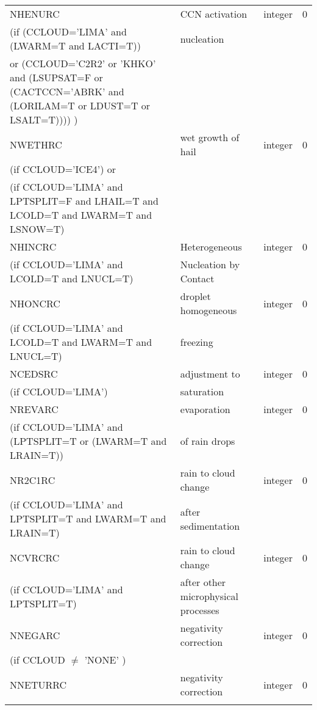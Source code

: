 \begin{longtable} {|p{}|p{}|>{\centering}p{}|p{}<{\centering}|}
NHENURC  & CCN activation  & integer  &  0 \index{NHENURC!\innam{NAM\_BU\_RRC}}\\ \nopagebreak
(if (CCLOUD='LIMA' and (LWARM=T and LACTI=T)) & nucleation & & \\ \nopagebreak
 or (CCLOUD='C2R2' or 'KHKO' and (LSUPSAT=F or (CACTCCN='ABRK' and (LORILAM=T or LDUST=T or LSALT=T)))) ) & & & \\ \hline
NWETHRC  & wet growth of hail & integer  &  0 \index{NWETHRC!\innam{NAM\_BU\_RRC}}\\ \nopagebreak
(if CCLOUD='ICE4') or & &   &  \\ \nopagebreak
(if CCLOUD='LIMA' and LPTSPLIT=F and LHAIL=T and LCOLD=T and LWARM=T and LSNOW=T) & &   &  \\\hline
NHINCRC  & Heterogeneous  & integer  &  0 \index{NHINCRC!\innam{NAM\_BU\_RRC}}\\ \nopagebreak
(if CCLOUD='LIMA' and LCOLD=T and LNUCL=T)   & Nucleation by Contact  &       &   \\\hline
NHONCRC  & droplet homogeneous   & integer  &  0 \index{NHONCRC!\innam{NAM\_BU\_RRC}}\\ \nopagebreak
(if CCLOUD='LIMA' and LCOLD=T and LWARM=T and LNUCL=T)   &freezing   &       &   \\\hline
NCEDSRC  & adjustment to & integer  &  0 \index{NCEDSRC!\innam{NAM\_BU\_RRC}}\\ \nopagebreak
(if CCLOUD='LIMA') &saturation &   &  \\\hline
NREVARC  & evaporation   & integer  &  0 \index{NREVARC!\innam{NAM\_BU\_RRC}}\\ \nopagebreak
(if CCLOUD='LIMA' and (LPTSPLIT=T or (LWARM=T and LRAIN=T)) & of rain drops &   &  \\\hline
NR2C1RC  & rain to cloud change & integer  &  0 \index{NR2C1RC!\innam{NAM\_BU\_RRC}}\\ \nopagebreak
(if CCLOUD='LIMA' and LPTSPLIT=T and LWARM=T and LRAIN=T) & after sedimentation &   &  \\\hline
NCVRCRC  & rain to cloud change & integer  &  0 \index{NCVRCRC!\innam{NAM\_BU\_RRC}}\\ \nopagebreak
(if CCLOUD='LIMA' and LPTSPLIT=T) &after other microphysical processes &   &  \\\hline
NNEGARC   & negativity correction & integer  &  0 \index{NNEGARC!\innam{NAM\_BU\_RRC}}\\ \nopagebreak
(if CCLOUD $\neq$ 'NONE' )& &   &  \\\hline
NNETURRC  &negativity correction   & integer  &  0 \index{NNETURRC!\innam{NAM\_BU\_RRC}}\\ \nopagebreak

\end{longtable}
